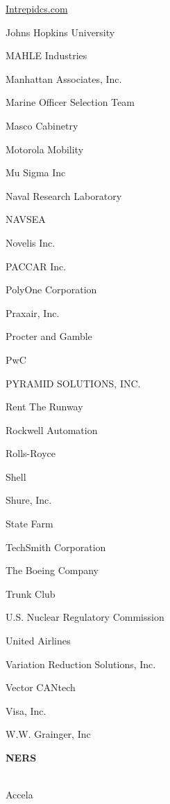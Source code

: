 \documentclass[twoside]{article}
\begin{document}
\begin{center}
\begin{multicols}{5}
\begin{FlushLeft}
\begin{compactitem}
\item \url{Intrepidcs.com}
\item Johns Hopkins University
\item MAHLE Industries
\item Manhattan Associates, Inc.
\item Marine Officer Selection Team
\item Masco Cabinetry
\item Motorola Mobility
\item Mu Sigma Inc
\item Naval Research Laboratory
\item NAVSEA
\item Novelis Inc.
\item PACCAR Inc.
\item PolyOne Corporation
\item Praxair, Inc.
\item Procter and Gamble
\item PwC
\item PYRAMID SOLUTIONS, INC.
\item Rent The Runway
\item Rockwell Automation
\item Rolls-Royce
\item Shell
\item Shure, Inc.
\item State Farm
\item TechSmith Corporation
\item The Boeing Company
\item Trunk Club
\item U.S. Nuclear Regulatory Commission
\item United Airlines
\item Variation Reduction Solutions, Inc.
\item Vector CANtech
\item Visa, Inc.
\item W.W. Grainger, Inc
\end{compactitem}
        \end{FlushLeft}
        \vspace{.2em}
        {\fontsize{14}{16}\selectfont \bf NERS}\\
        \vspace{-1em}
        ~\hrulefill~
        \vspace{-.9em}
        \begin{FlushLeft}
        \begin{compactitem}
        \item Accela

\end{compactitem}
\end{FlushLeft}
\end{multicols}
\end{center}
\end{document}
